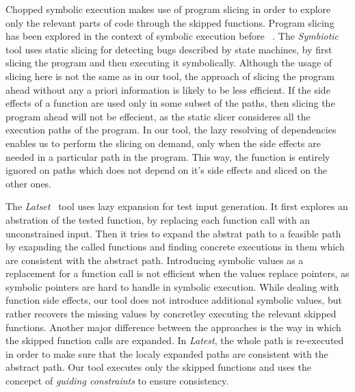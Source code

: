 Chopped symbolic execution makes use of program slicing in order to
explore only the relevant parts of code through the skipped functions.
Program slicing has been explored in the context of symbolic execution before ~\cite{babic11,slaby2013symbiotic}.
The \textit{Symbiotic}~\cite{slaby2013symbiotic} tool uses static slicing for
detecting bugs described by state machines,
by first slicing the program and then executing it symbolically.
Although the usage of slicing here is not the same as in our tool,
the approach of slicing the program ahead without any a priori information is likely to be less efficient.
If the side effects of a function are used only in some subset of the paths,
then slicing the program ahead will not be effecient,
as the static slicer consideres all the execution paths of the program.
In our tool, the lazy resolving of dependencies enables us to perform the slicing on demand,
only when the side effects are needed in a particular path in the program.
This way, the function is entirely ignored on paths which does not depend on it's side effects
and sliced on the other ones.

The \textit{Latset}~\cite{majumdar2007latest} tool uses lazy expansion for test input generation.
It first explores an abstration of the tested function,
by replacing each function call with an unconstrained input.
Then it tries to expand the abstrat path to a feasible path
by exapnding the called functions and finding concrete executions in them
which are consistent with the abstract path.
Introducing symbolic values as a replacement for a function call
is not efficient when the values replace pointers,
as symbolic pointers are hard to handle in symbolic execution.
While dealing with function side effects,
our tool does not introduce additional symbolic values,
but rather recovers the missing values by concretley executing the relevant skipped functions.
Another major difference between the approaches is the way in which
the skipped function calls are expanded.
In \textit{Latest}, the whole path is re-executed in order to make sure that the
localy expanded paths are consistent with the abstract path.
Our tool executes only the skipped functions
and uses the concepct of \textit{guiding constraints} to ensure consistency.


